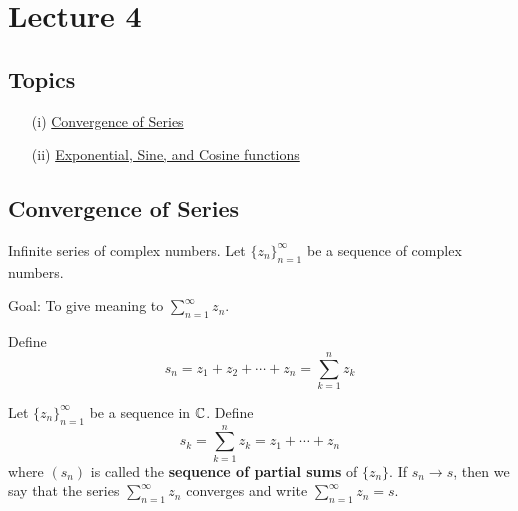 \documentclass[a4paper]{report}
\begin{document}
\section{Lecture 4}

\subsection{Topics}

\begin{enumerate}
    \item[(i)] {\hyperref[Convergence of Series]{Convergence of Series}} 
    \item[(ii)] {\hyperref[Exponential, Sine, and Cosine functions]{Exponential, Sine, and Cosine functions}} 
\end{enumerate}


\subsection{Convergence of Series}\label{Convergence of Series}

Infinite series of complex numbers. Let \( \{ {z}_{n} \}_{n=1}^{\infty } \) be a sequence of complex numbers. 

Goal: To give meaning to \( \sum_{ n=1  }^{ \infty  } {z}_{n} \).

Define \[ {s}_{n} = {z}_{1} + {z}_{2} + \cdots + {z}_{n} = \sum_{ k = 1  }^{ n } {z}_{k} \] 
\begin{definition}
    Let \( \{ {z}_{n} \}_{n=1}^{\infty } \) be a sequence in \( \mathbb{C}  \). Define 
    \[  {s}_{k} = \sum_{ k=1  }^{ n } {z}_{k } = {z}_{1} + \cdots + {z}_{n} \]
    where \( ({s}_{n}) \) is called the \textbf{sequence of partial sums} of \( \{ {z}_{n} \}  \). If \( {s}_{n} \to s \), then we say that the series \( \sum_{ n=1  }^{ \infty  } {z}_{n} \) converges and write \( \sum_{ n=1  }^{ \infty  } {z}_{n} = s  \).
\end{definition}
\end{document}
